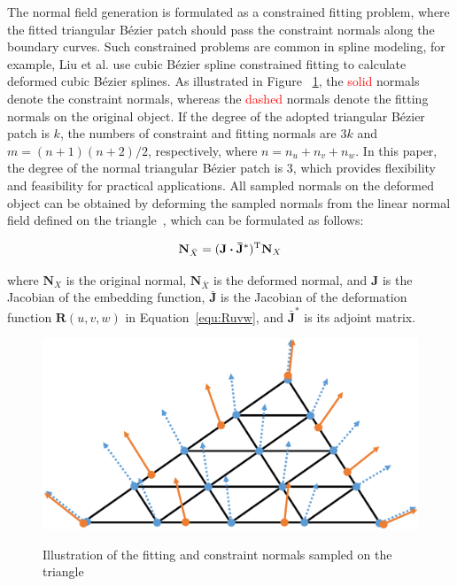 \documentclass[3p]{elsarticle}
\begin{document}
The normal field generation is formulated as a constrained fitting problem, where the fitted triangular B\'ezier patch
should pass the constraint normals along the boundary curves. Such constrained problems are common in spline modeling,
for example, Liu et al. \cite{Liu14} use cubic B\'ezier spline constrained fitting to calculate deformed cubic B\'ezier
splines. As illustrated in Figure ~\ref{fig:normal_fitting}, the \textcolor{red}{solid} normals denote the constraint
normals, whereas the \textcolor{red}{dashed} normals denote the fitting normals on the original object. If the degree
of the adopted triangular B\'ezier patch is $k$, the numbers of constraint and fitting normals are $3k$ and
$m=(n+1)(n+2)/2$, respectively, where $n=n_u+n_v+n_w$. In this paper, the degree of the normal triangular B\'ezier patch
is 3, which provides flexibility and feasibility for practical applications. All sampled normals on the deformed object
can be obtained by deforming the sampled normals from the linear normal field defined on the triangle~\cite{Gain99},
which can be formulated as follows:

\begin{equation}
	\footnotesize
	\mathbf N_{\bar X}=(\mathbf J \bm\cdot\mathbf {\bar J}^*)^{\mathrm T}\mathbf N_X
	\label{equ:gain_normal}
\end{equation}

\noindent where $\mathbf N_X$ is the original normal, $\mathbf N_{\bar X}$ is the deformed normal, and $\mathbf J$ is
the Jacobian of the embedding function, $\mathbf {\bar J}$ is the Jacobian of the deformation function $\mathbf R(u, v,
w)$ in Equation~\ref{equ:Ruvw}, and $\mathbf {\bar J}^*$ is its adjoint matrix.

\begin{figure}
	\centering
		{\includegraphics[width=\linewidth]{pic/normal_fitting_1.png}}
	\caption{Illustration of the fitting and constraint normals sampled on the triangle}
	\label{fig:normal_fitting}
\end{figure}
\end{document}
